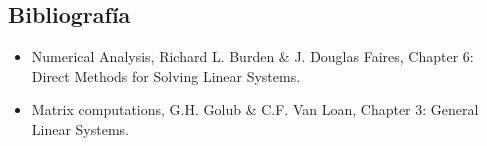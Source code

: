 \subsection{Bibliografía}

\begin{itemize}
 \item Numerical Analysis, Richard L. Burden \& J. Douglas Faires, Chapter 6: Direct Methods for Solving Linear Systems.
 \item Matrix computations, G.H. Golub \& C.F. Van Loan, Chapter 3: General Linear Systems.
\end{itemize}
